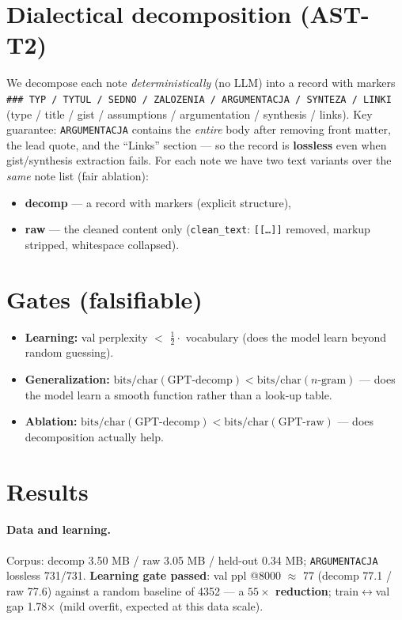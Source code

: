 \documentclass[11pt]{article}
\begin{document}
\section{Dialectical decomposition (AST-T2)}
We decompose each note \emph{deterministically} (no LLM) into a record with markers
\texttt{\#\#\# TYP / TYTUL / SEDNO / ZALOZENIA / ARGUMENTACJA / SYNTEZA / LINKI} (type / title / gist / assumptions /
argumentation / synthesis / links). Key guarantee: \texttt{ARGUMENTACJA} contains the \emph{entire} body after
removing front matter, the lead quote, and the ``Links'' section --- so the record is \textbf{lossless} even when
gist/synthesis extraction fails. For each note we have two text variants over the \emph{same} note list (fair
ablation):
\begin{itemize}
  \item \textbf{decomp} --- a record with markers (explicit structure),
  \item \textbf{raw} --- the cleaned content only (\texttt{clean\_text}: \texttt{[[\ldots]]} removed, markup
  stripped, whitespace collapsed).
\end{itemize}

\section{Gates (falsifiable)}
\begin{itemize}
  \item \textbf{Learning:} val perplexity $<$ $\tfrac12\cdot$ vocabulary (does the model learn beyond random
  guessing).
  \item \textbf{Generalization:} $\text{bits/char}(\text{GPT-decomp}) < \text{bits/char}(\text{$n$-gram})$ --- does
  the model learn a smooth function rather than a look-up table.
  \item \textbf{Ablation:} $\text{bits/char}(\text{GPT-decomp}) < \text{bits/char}(\text{GPT-raw})$ --- does
  decomposition actually help.
\end{itemize}

\section{Results}
\paragraph{Data and learning.} Corpus: decomp 3.50 MB / raw 3.05 MB / held-out 0.34 MB; \texttt{ARGUMENTACJA}
lossless 731/731. \textbf{Learning gate passed}: val ppl @8000 $\approx$ 77 (decomp 77.1 / raw 77.6) against a
random baseline of 4352 --- a \textbf{$55\times$ reduction}; train$\leftrightarrow$val gap 1.78$\times$ (mild
overfit, expected at this data scale).
\end{document}
